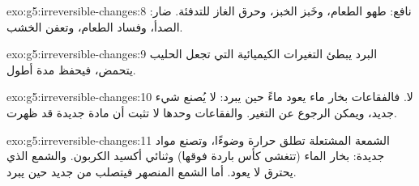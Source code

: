 \begin{solution}{exo:g5:irreversible-changes:8}
نافع: طهو الطعام، وخَبز الخبز، وحرق الغاز للتدفئة. ضار: الصدأ، وفساد
الطعام، وتعفن الخشب.
\end{solution}

\begin{solution}{exo:g5:irreversible-changes:9}
البرد يبطئ التغيرات الكيميائية التي تجعل الحليب يتحمض، فيحفظ مدة
أطول.
\end{solution}

\begin{solution}{exo:g5:irreversible-changes:10}
لا. فالفقاعات بخار ماء يعود ماءً حين يبرد: لا يُصنع شيء جديد، ويمكن
الرجوع عن التغير. والفقاعات وحدها لا تثبت أن مادة جديدة قد
ظهرت.
\end{solution}

\begin{solution}{exo:g5:irreversible-changes:11}
الشمعة المشتعلة تطلق حرارة وضوءًا، وتصنع مواد جديدة: بخار الماء (تتغشى
كأس باردة فوقها) وثنائي أكسيد الكربون. والشمع الذي يحترق لا يعود. أما
الشمع المنصهر فيتصلب من جديد حين يبرد.
\end{solution}

